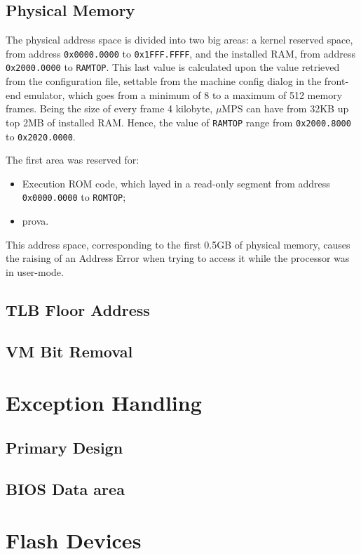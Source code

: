 \documentclass[12pt,a4paper,openright,twoside]{report}
\begin{document}
\section{Physical Memory}
	The physical address space is divided into two big areas: a kernel reserved space, from address \texttt{0x0000.0000} to \texttt{0x1FFF.FFFF}, and the installed RAM, from address \texttt{0x2000.0000} to \texttt{RAMTOP}.
	This last value is calculated upon the value retrieved from the configuration file, settable from the machine config dialog in the front-end emulator, which goes from a minimum of 8 to a maximum of 512 memory frames.
	Being the size of every frame 4 kilobyte, $\mu$MPS can have from 32KB up top 2MB of installed RAM. Hence, the value of \texttt{RAMTOP} range from \texttt{0x2000.8000} to \texttt{0x2020.0000}.

	The first area was reserved for:
	\begin{itemize}  
	\item Execution ROM code, which layed in a read-only segment from address \texttt{0x0000.0000} to \texttt{ROMTOP};
	\item prova.
	\end{itemize}
	This address space, corresponding to the first 0.5GB of physical memory, causes the raising of an Address Error when trying to access it while the processor was in user-mode.
\section{TLB Floor Address}
\section{VM Bit Removal}
\chapter{Exception Handling}
\lhead[\fancyplain{}{\bfseries\thepage}]{\fancyplain{}{\bfseries\rightmark}}
\section{Primary Design}
\section{BIOS Data area}
\lhead[\fancyplain{}{\bfseries\thepage}]{\fancyplain{}{\bfseries\rightmark}}
\chapter{Flash Devices}
\lhead[\fancyplain{}{\bfseries\thepage}]{\fancyplain{}{\bfseries\rightmark}}
\end{document}
